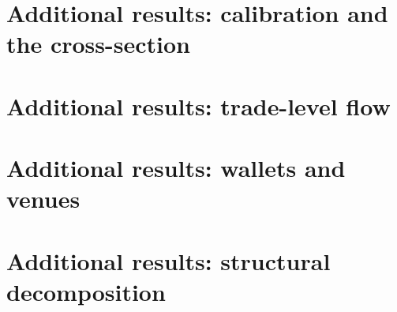 \documentclass[11pt]{article}
\theoremstyle{definition}
\theoremstyle{remark}
\begin{document}



\appendix
\section{Additional results: calibration and the cross-section}\label{app:xs}

\section{Additional results: trade-level flow}\label{app:flow}

\section{Additional results: wallets and venues}\label{app:wallets}

\section{Additional results: structural decomposition}\label{app:structural}

\end{document}
